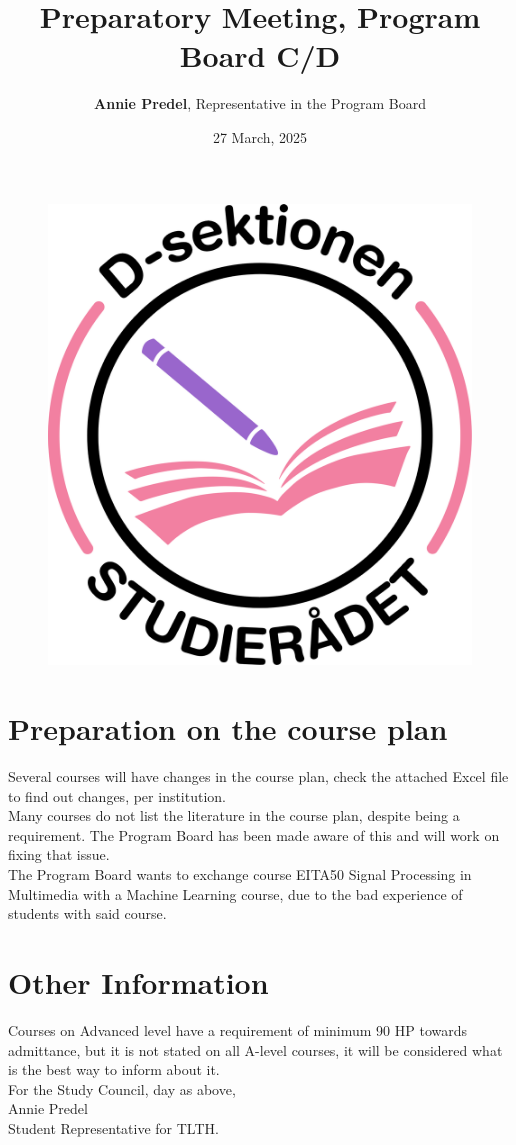 \documentclass{article}
\begin{document}
	\begin{figure}[t]
		\vspace{-60pt}
		\includegraphics[width= 32 mm, center]{SRDDark.png}
	\end{figure}
	
	\title{\vspace{-30pt}Preparatory Meeting, Program Board C/D}
	\author{\textbf{Annie Predel}, Representative in the Program Board}
	\date{27 March, 2025}
	\maketitle

	\section{Preparation on the course plan}
	
	Several courses will have changes in the course plan, check the attached Excel file to
	find out changes, per institution.\\

	Many courses do not list the literature in the course plan, despite being a requirement.
	The Program Board has been made aware of this and will work on fixing that issue.\\

	The Program Board wants to exchange course EITA50 Signal Processing in Multimedia
	with a Machine Learning course, due to the bad experience of students with said course.\\

	\section{Other Information}
	Courses on Advanced level have a requirement of minimum 90 HP towards admittance, but it is not
	stated on all A-level courses, it will be considered what is the best way to inform about it.\\\newline
	For the Study Council, day as above,\\
	Annie Predel\\
	Student Representative for TLTH.
	
	
\end{document}
